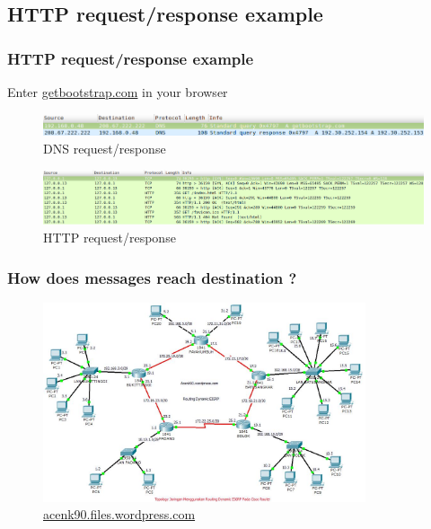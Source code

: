 \subsection{HTTP request/response example}
\begin{frame}
    \frametitle{HTTP request/response example}
      Enter \color{blue}\href{http://getbootstrap.com}{getbootstrap.com} \color{black} in your browser\pause
      \begin{figure}
    \includegraphics[width=11.5cm]{./imgs/dns-req.png}
  \caption{DNS request/response}
      \end{figure}
      \pause
      \begin{figure}
    \includegraphics[trim = 0 0 100mm 0, clip, width=11.5cm]{./imgs/http-req.png}
  \caption{HTTP request/response}
      \end{figure}
  \end{frame}
    \begin{frame}
    \frametitle{How does messages reach destination ?}
      \begin{figure}
    \includegraphics[width=9.5cm]{./imgs/routing.jpg}
  \caption{\color{blue}\href{http://acenk90.files.wordpress.com}{acenk90.files.wordpress.com}}
  \label{fig:routing}
      \end{figure}
  \end{frame}
